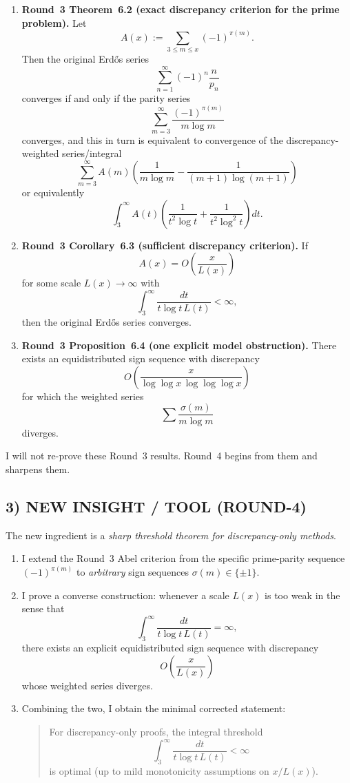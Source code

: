 \begin{enumerate}
\item \textbf{Round~3 Theorem~6.2 (exact discrepancy criterion for the prime problem).}
Let
\[
A(x):=\sum_{3\le m\le x}(-1)^{\pi(m)}.
\]
Then the original Erd\H{o}s series
\[
\sum_{n=1}^\infty (-1)^n\frac{n}{p_n}
\]
converges if and only if the parity series
\[
\sum_{m=3}^\infty \frac{(-1)^{\pi(m)}}{m\log m}
\]
converges, and this in turn is equivalent to convergence of the discrepancy-weighted series/integral
\[
\sum_{m=3}^\infty A(m)\left(\frac{1}{m\log m}-\frac{1}{(m+1)\log(m+1)}\right)
\]
or equivalently
\[
\int_3^\infty A(t)\left(\frac{1}{t^2\log t}+\frac{1}{t^2\log^2 t}\right)dt.
\]

\item \textbf{Round~3 Corollary~6.3 (sufficient discrepancy criterion).}
If
\[
A(x)=O\!\left(\frac{x}{L(x)}\right)
\]
for some scale $L(x)\to\infty$ with
\[
\int_3^\infty \frac{dt}{t\log t\,L(t)}<\infty,
\]
then the original Erd\H{o}s series converges.

\item \textbf{Round~3 Proposition~6.4 (one explicit model obstruction).}
There exists an equidistributed sign sequence with discrepancy
\[
O\!\left(\frac{x}{\log\log x\,\log\log\log x}\right)
\]
for which the weighted series
\[
\sum \frac{\sigma(m)}{m\log m}
\]
diverges.
\end{enumerate}

I will not re-prove these Round~3 results. Round~4 begins from them and sharpens them.

\subsection*{3) NEW INSIGHT / TOOL (ROUND-4)}

The new ingredient is a \emph{sharp threshold theorem for discrepancy-only methods}.

\begin{enumerate}
\item I extend the Round~3 Abel criterion from the specific prime-parity sequence $(-1)^{\pi(m)}$ to \emph{arbitrary} sign sequences $\sigma(m)\in\{\pm1\}$.

\item I prove a converse construction: whenever a scale $L(x)$ is too weak in the sense that
\[
\int_3^\infty \frac{dt}{t\log t\,L(t)}=\infty,
\]
there exists an explicit equidistributed sign sequence with discrepancy
\[
O\!\left(\frac{x}{L(x)}\right)
\]
whose weighted series diverges.

\item Combining the two, I obtain the minimal corrected statement:
\begin{quote}
For discrepancy-only proofs, the integral threshold
\[
\int_3^\infty \frac{dt}{t\log t\,L(t)}<\infty
\]
is optimal (up to mild monotonicity assumptions on $x/L(x)$).
\end{quote}
\end{enumerate}

